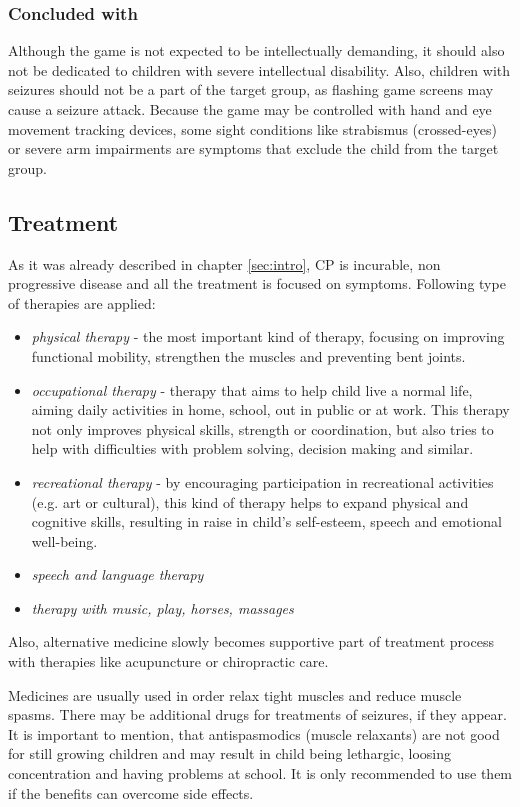 \subsubsection*{Concluded with}
Although the game is not expected to be intellectually demanding, it should also not be dedicated to children with severe intellectual disability. Also, children with seizures should not be a part of the target group, as flashing game screens may cause a seizure attack. Because the game may be controlled with hand and eye movement tracking devices, some sight conditions like strabismus (crossed-eyes) or severe arm impairments are symptoms that exclude the child from the target group.


\subsection{Treatment}
As it was already described in chapter \ref{sec:intro}, CP is incurable, non progressive disease and all the treatment is focused on symptoms. Following type of therapies are applied:
\begin{itemize}
\item \emph{physical therapy} - the most important kind of therapy, focusing on improving functional mobility, strengthen the muscles and preventing bent joints.
\item \emph{occupational therapy} - therapy that aims to help child live a normal life, aiming daily activities in home, school, out in public or at work. This therapy not only improves physical skills, strength or coordination, but also tries to help with difficulties with problem solving, decision making and similar.
\item \emph{recreational therapy} - by encouraging participation in recreational activities	(e.g. art or cultural), this kind of therapy helps to expand physical and cognitive skills, resulting in raise in child's self-esteem, speech and emotional well-being.
\item \emph{speech and language therapy}
\item \emph{therapy with music, play, horses, massages}
\end{itemize}


Also, alternative medicine slowly becomes supportive part of treatment process with therapies like acupuncture or chiropractic care. 

Medicines are usually used in order relax tight muscles and reduce muscle spasms. There may be additional drugs for treatments of seizures, if they appear. It is important to mention, that antispasmodics (muscle relaxants) are not good for still growing children and may result in child being lethargic, loosing concentration and having problems at school. It is only recommended to use them if the benefits can overcome side effects. 

